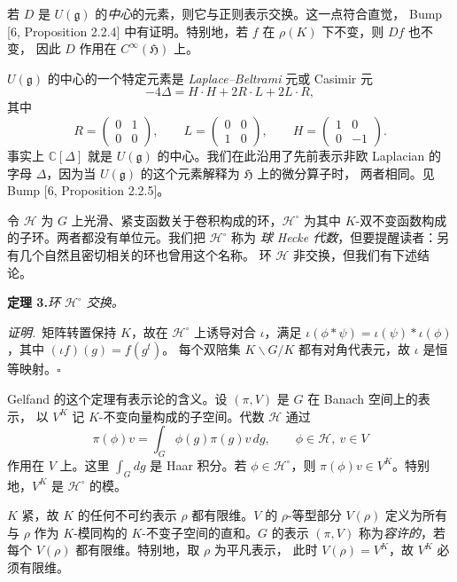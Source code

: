 若 $D$ 是 $U(\mathfrak{g})$ 的\emph{中心}的元素，则它与正则表示交换。这一点符合直觉，
Bump [6, Proposition 2.2.4] 中有证明。特别地，若 $f$ 在 $\rho(K)$ 下不变，则 $Df$ 也不变，
因此 $D$ 作用在 $C^{\infty}(\mathfrak{H})$ 上。

$U(\mathfrak{g})$ 的中心的一个特定元素是 \emph{Laplace--Beltrami} 元或 Casimir 元
\begin{equation}\tag{3}
-4\Delta=H\cdot H+2R\cdot L+2L\cdot R,
\end{equation}
其中
\[
R=\begin{pmatrix}0&1\\0&0\end{pmatrix},\qquad
L=\begin{pmatrix}0&0\\1&0\end{pmatrix},\qquad
H=\begin{pmatrix}1&0\\0&-1\end{pmatrix}.
\]
事实上 $\mathbb{C}[\Delta]$ 就是 $U(\mathfrak{g})$ 的中心。我们在此沿用了先前表示非欧 Laplacian
的字母 $\Delta$，因为当 $U(\mathfrak{g})$ 的这个元素解释为 $\mathfrak{H}$ 上的微分算子时，
两者相同。见 Bump [6, Proposition 2.2.5]。

令 $\mathcal{H}$ 为 $G$ 上光滑、紧支函数关于卷积构成的环，$\mathcal{H}^{\circ}$ 为其中
$K$-双不变函数构成的子环。两者都没有单位元。我们把 $\mathcal{H}^{\circ}$ 称为
\emph{球 Hecke 代数}，但要提醒读者：另有几个自然且密切相关的环也曾用这个名称。
环 $\mathcal{H}$ 非交换，但我们有下述结论。

\par\medskip\noindent\textbf{定理 3.}\quad\emph{环 $\mathcal{H}^{\circ}$ 交换。}

\smallskip
\noindent\emph{证明.}\ 矩阵转置保持 $K$，故在 $\mathcal{H}^{\circ}$ 上诱导对合 $\iota$，满足
$\iota(\phi*\psi)=\iota(\psi)*\iota(\phi)$，其中 $(\iota f)(g)=f(g^{t})$。
每个双陪集 $K\backslash G/K$ 都有对角代表元，故 $\iota$ 是恒等映射。\hfill$\square$

Gelfand 的这个定理有表示论的含义。设 $(\pi,V)$ 是 $G$ 在 Banach 空间上的表示，
以 $V^{K}$ 记 $K$-不变向量构成的子空间。代数 $\mathcal{H}$ 通过
\[
\pi(\phi)v=\int_{G}\phi(g)\pi(g)v\,dg,\qquad \phi\in\mathcal{H},\ v\in V
\]
作用在 $V$ 上。这里 $\int_{G}dg$ 是 Haar 积分。若 $\phi\in\mathcal{H}^{\circ}$，则
$\pi(\phi)v\in V^{K}$。特别地，$V^{K}$ 是 $\mathcal{H}^{\circ}$ 的模。

$K$ 紧，故 $K$ 的任何不可约表示 $\rho$ 都有限维。$V$ 的 $\rho$-等型部分 $V(\rho)$
定义为所有与 $\rho$ 作为 $K$-模同构的 $K$-不变子空间的直和。$G$ 的表示 $(\pi,V)$
称为\emph{容许的}，若每个 $V(\rho)$ 都有限维。特别地，取 $\rho$ 为平凡表示，
此时 $V(\rho)=V^{K}$，故 $V^{K}$ 必须有限维。

